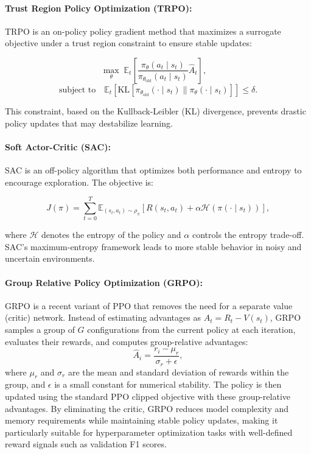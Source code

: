 \documentclass[11pt]{article}
\begin{document}
\paragraph{Trust Region Policy Optimization (TRPO):} TRPO is an on-policy policy gradient method that maximizes a surrogate objective under a trust region constraint to ensure stable updates:

\[
\max_\theta \; \mathbb{E}_t \left[ \frac{\pi_\theta(a_t \mid s_t)}{\pi_{\theta_{\text{old}}}(a_t \mid s_t)} \hat{A}_t \right],
\quad\]
\[\text{subject to} \quad \mathbb{E}_t \left[ \text{KL}\left[\pi_{\theta_{\text{old}}}(\cdot \mid s_t) \| \pi_\theta(\cdot \mid s_t)\right] \right] \leq \delta.
\]

This constraint, based on the Kullback-Leibler (KL) divergence, prevents drastic policy updates that may destabilize learning.

\paragraph{Soft Actor-Critic (SAC):} SAC is an off-policy algorithm that optimizes both performance and entropy to encourage exploration. The objective is:

\[
J(\pi) = \sum_{t=0}^T \mathbb{E}_{(s_t, a_t) \sim \rho_\pi} \left[ R(s_t, a_t) + \alpha \mathcal{H}(\pi(\cdot \mid s_t)) \right],
\]

where $\mathcal{H}$ denotes the entropy of the policy and $\alpha$ controls the entropy trade-off. SAC's maximum-entropy framework leads to more stable behavior in noisy and uncertain environments.

\paragraph{Group Relative Policy Optimization (GRPO):} GRPO is a recent variant of PPO that removes the need for a separate value (critic) network. Instead of estimating advantages as $A_t = R_t - V(s_t)$, GRPO samples a group of $G$ configurations from the current policy at each iteration, evaluates their rewards, and computes group-relative advantages:
\[
\hat{A}_i = \frac{r_i - \mu_r}{\sigma_r + \epsilon},
\]
where $\mu_r$ and $\sigma_r$ are the mean and standard deviation of rewards within the group, and $\epsilon$ is a small constant for numerical stability. The policy is then updated using the standard PPO clipped objective with these group-relative advantages. By eliminating the critic, GRPO reduces model complexity and memory requirements while maintaining stable policy updates, making it particularly suitable for hyperparameter optimization tasks with well-defined reward signals such as validation F1 scores.
\end{document}
